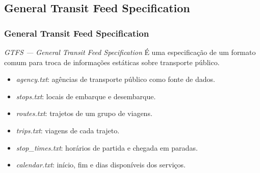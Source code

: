 \documentclass{beamer}
\begin{document}
\subsection{General Transit Feed Specification}
\begin{frame}
\frametitle{General Transit Feed Specification}
\begin{block}{\textit{GTFS --- General Transit Feed Specification}}
É uma especificação de um formato comum para troca de informações estáticas sobre transporte público.
\begin{itemize}
\item \textit{agency.txt}: agências de transporte público como fonte de dados.
\item \textit{stops.txt}: locais de embarque e desembarque.
\item \textit{routes.txt}: trajetos de um grupo de viagens.
\item \textit{trips.txt}: viagens de cada trajeto.
\item \textit{stop\_times.txt}: horários de partida e chegada em paradas.
\item \textit{calendar.txt}: início, fim e dias disponíveis dos serviços.
\end{itemize}
\end{block}
\end{frame}
\end{document}
